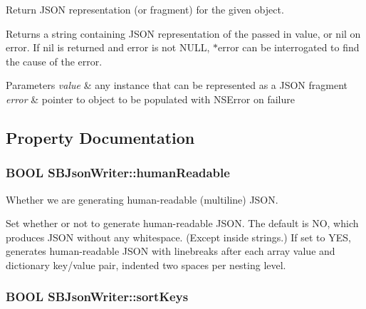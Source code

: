 \-Return \-J\-S\-O\-N representation (or fragment) for the given object. 

\-Returns a string containing \-J\-S\-O\-N representation of the passed in value, or nil on error. \-If nil is returned and {\ttfamily error} is not \-N\-U\-L\-L, {\ttfamily $\ast$error} can be interrogated to find the cause of the error.


\begin{DoxyParams}{\-Parameters}
{\em value} & any instance that can be represented as a \-J\-S\-O\-N fragment \\
\hline
{\em error} & pointer to object to be populated with \-N\-S\-Error on failure \\
\hline
\end{DoxyParams}


\subsection{\-Property \-Documentation}
\hypertarget{interface_s_b_json_writer_a16ca84860a2ee76a03b567dc5181a851}{
\subsubsection[{human\-Readable}]{\setlength{\rightskip}{0pt plus 5cm}\-B\-O\-O\-L \-S\-B\-Json\-Writer\-::human\-Readable}}
\label{interface_s_b_json_writer_a16ca84860a2ee76a03b567dc5181a851}


\-Whether we are generating human-\/readable (multiline) \-J\-S\-O\-N. 

\-Set whether or not to generate human-\/readable \-J\-S\-O\-N. \-The default is \-N\-O, which produces \-J\-S\-O\-N without any whitespace. (\-Except inside strings.) \-If set to \-Y\-E\-S, generates human-\/readable \-J\-S\-O\-N with linebreaks after each array value and dictionary key/value pair, indented two spaces per nesting level. \hypertarget{interface_s_b_json_writer_af25807a58a322b56cb5d3593532228e5}{
\subsubsection[{sort\-Keys}]{\setlength{\rightskip}{0pt plus 5cm}\-B\-O\-O\-L \-S\-B\-Json\-Writer\-::sort\-Keys}}
\label{interface_s_b_json_writer_af25807a58a322b56cb5d3593532228e5}


